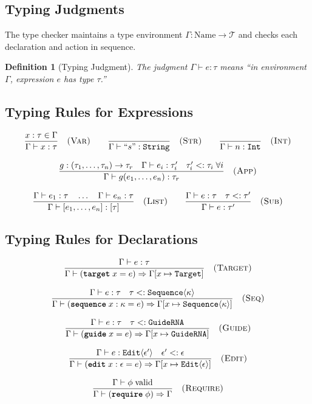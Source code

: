 \documentclass[12pt,a4paper]{article}
\newtheorem{definition}[theorem]{Definition}
\newcommand{\ty}[1]{\texttt{#1}}
\newcommand{\kw}[1]{\textbf{\texttt{#1}}}
\begin{document}
\subsection{Typing Judgments}

The type checker maintains a type environment $\Gamma : \text{Name} \to \mathcal{T}$ and checks each declaration and action in sequence.

\begin{definition}[Typing Judgment]
The judgment $\Gamma \vdash e : \tau$ means ``in environment $\Gamma$, expression $e$ has type $\tau$.''
\end{definition}

\subsection{Typing Rules for Expressions}

\begin{gather}
\frac{x : \tau \in \Gamma}{\Gamma \vdash x : \tau} \quad \textsc{(Var)}
\qquad
\frac{}{\Gamma \vdash \text{``}s\text{''} : \ty{String}} \quad \textsc{(Str)}
\qquad
\frac{}{\Gamma \vdash n : \ty{Int}} \quad \textsc{(Int)}
\\[8pt]
\frac{g : (\tau_1, \ldots, \tau_n) \to \tau_r \quad \Gamma \vdash e_i : \tau_i' \quad \tau_i' <: \tau_i \;\forall i}{\Gamma \vdash g(e_1, \ldots, e_n) : \tau_r} \quad \textsc{(App)}
\\[8pt]
\frac{\Gamma \vdash e_1 : \tau \quad \ldots \quad \Gamma \vdash e_n : \tau}{\Gamma \vdash [e_1, \ldots, e_n] : [\tau]} \quad \textsc{(List)}
\qquad
\frac{\Gamma \vdash e : \tau \quad \tau <: \tau'}{\Gamma \vdash e : \tau'} \quad \textsc{(Sub)}
\end{gather}

\subsection{Typing Rules for Declarations}

\begin{gather}
\frac{\Gamma \vdash e : \tau}{\Gamma \vdash (\kw{target}\; x = e) \Rightarrow \Gamma[x \mapsto \ty{Target}]} \quad \textsc{(Target)}
\\[8pt]
\frac{\Gamma \vdash e : \tau \quad \tau <: \ty{Sequence}\langle\kappa\rangle}{\Gamma \vdash (\kw{sequence}\; x : \kappa = e) \Rightarrow \Gamma[x \mapsto \ty{Sequence}\langle\kappa\rangle]} \quad \textsc{(Seq)}
\\[8pt]
\frac{\Gamma \vdash e : \tau \quad \tau <: \ty{GuideRNA}}{\Gamma \vdash (\kw{guide}\; x = e) \Rightarrow \Gamma[x \mapsto \ty{GuideRNA}]} \quad \textsc{(Guide)}
\\[8pt]
\frac{\Gamma \vdash e : \ty{Edit}\langle\epsilon'\rangle \quad \epsilon' <: \epsilon}{\Gamma \vdash (\kw{edit}\; x : \epsilon = e) \Rightarrow \Gamma[x \mapsto \ty{Edit}\langle\epsilon\rangle]} \quad \textsc{(Edit)}
\\[8pt]
\frac{\Gamma \vdash \phi \;\text{valid}}{\Gamma \vdash (\kw{require}\; \phi) \Rightarrow \Gamma} \quad \textsc{(Require)}
\end{gather}
\end{document}
